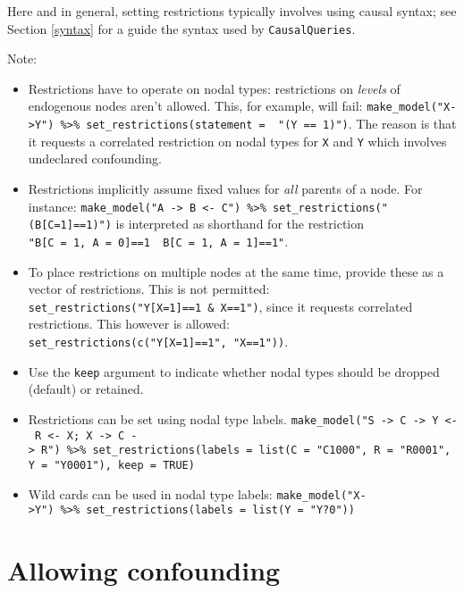 \documentclass[
  12pt,
]{book}
\providecommand{\tightlist}{%
  \setlength{\itemsep}{0pt}\setlength{\parskip}{0pt}}
\begin{document}
Here and in general, setting restrictions typically involves using causal syntax; see Section \ref{syntax} for a guide the syntax used by \texttt{CausalQueries}.

Note:

\begin{itemize}
\tightlist
\item
  Restrictions have to operate on nodal types: restrictions on \emph{levels} of endogenous nodes aren't allowed. This, for example, will fail:
  \texttt{make\_model("X-\textgreater{}Y")\ \%\textgreater{}\%\ set\_restrictions(statement\ =\ \ "(Y\ ==\ 1)")}. The reason is that it requests a correlated restriction on nodal types for \texttt{X} and \texttt{Y} which involves undeclared confounding.
\item
  Restrictions implicitly assume fixed values for \emph{all} parents of a node. For instance: \texttt{make\_model("A\ -\textgreater{}\ B\ \textless{}-\ C")\ \%\textgreater{}\%\ set\_restrictions("(B{[}C=1{]}==1)")} is interpreted as shorthand for the restriction \texttt{"B{[}C\ =\ 1,\ A\ =\ 0{]}==1\ \textbar{}\ B{[}C\ =\ 1,\ A\ =\ 1{]}==1"}.
\item
  To place restrictions on multiple nodes at the same time, provide these as a vector of restrictions. This is not permitted: \texttt{set\_restrictions("Y{[}X=1{]}==1\ \&\ X==1")}, since it requests correlated restrictions. This however is allowed: \texttt{set\_restrictions(c("Y{[}X=1{]}==1",\ "X==1"))}.\\
\item
  Use the \texttt{keep} argument to indicate whether nodal types should be dropped (default) or retained.
\item
  Restrictions can be set using nodal type labels. \texttt{make\_model("S\ -\textgreater{}\ C\ -\textgreater{}\ Y\ \textless{}-\ R\ \textless{}-\ X;\ X\ -\textgreater{}\ C\ -\textgreater{}\ R")\ \%\textgreater{}\%\ set\_restrictions(labels\ =\ list(C\ =\ "C1000",\ R\ =\ "R0001",\ Y\ =\ "Y0001"),\ keep\ =\ TRUE)}
\item
  Wild cards can be used in nodal type labels: \texttt{make\_model("X-\textgreater{}Y")\ \%\textgreater{}\%\ set\_restrictions(labels\ =\ list(Y\ =\ "Y?0"))}
\end{itemize}

\hypertarget{confounding}{%
\section{Allowing confounding}\label{confounding}}
\end{document}
